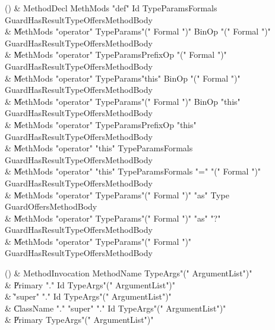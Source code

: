 \begin{bbgrammarappendix}

() & MethodDecl \label{prod:MethodDecl}  \: MethMods \xcd"def" Id TypeParams\opt Formals Guard\opt HasResultType\opt Offers\opt MethodBody  \\

 &    \| MethMods \xcd"operator" TypeParams\opt \xcd"(" Formal  \xcd")" BinOp \xcd"(" Formal  \xcd")" Guard\opt HasResultType\opt Offers\opt MethodBody \\
 &    \| MethMods \xcd"operator" TypeParams\opt PrefixOp \xcd"(" Formal  \xcd")" Guard\opt HasResultType\opt Offers\opt MethodBody \\
 &    \| MethMods \xcd"operator" TypeParams\opt \xcd"this" BinOp \xcd"(" Formal  \xcd")" Guard\opt HasResultType\opt Offers\opt MethodBody \\
 &    \| MethMods \xcd"operator" TypeParams\opt \xcd"(" Formal  \xcd")" BinOp \xcd"this" Guard\opt HasResultType\opt Offers\opt MethodBody \\
 &    \| MethMods \xcd"operator" TypeParams\opt PrefixOp \xcd"this" Guard\opt HasResultType\opt Offers\opt MethodBody \\
 &    \| MethMods \xcd"operator" \xcd"this" TypeParams\opt Formals Guard\opt HasResultType\opt Offers\opt MethodBody \\
 &    \| MethMods \xcd"operator" \xcd"this" TypeParams\opt Formals \xcd"=" \xcd"(" Formal  \xcd")" Guard\opt HasResultType\opt Offers\opt MethodBody \\
 &    \| MethMods \xcd"operator" TypeParams\opt \xcd"(" Formal  \xcd")" \xcd"as" Type Guard\opt Offers\opt MethodBody \\
 &    \| MethMods \xcd"operator" TypeParams\opt \xcd"(" Formal  \xcd")" \xcd"as" \xcd"?" Guard\opt HasResultType\opt Offers\opt MethodBody \\
 &    \| MethMods \xcd"operator" TypeParams\opt \xcd"(" Formal  \xcd")" Guard\opt HasResultType\opt Offers\opt MethodBody \\

\end{bbgrammarappendix}

\begin{bbgrammarappendix}

() & MethodInvocation \label{prod:MethodInvocation}  \: MethodName TypeArgs\opt \xcd"(" ArgumentList\opt \xcd")"  \\

 &    \| Primary \xcd"." Id TypeArgs\opt \xcd"(" ArgumentList\opt \xcd")" \\
 &    \| \xcd"super" \xcd"." Id TypeArgs\opt \xcd"(" ArgumentList\opt \xcd")" \\
 &    \| ClassName \xcd"." \xcd"super"  \xcd"." Id TypeArgs\opt \xcd"(" ArgumentList\opt \xcd")" \\
 &    \| Primary TypeArgs\opt \xcd"(" ArgumentList\opt \xcd")" \\

\end{bbgrammarappendix}

